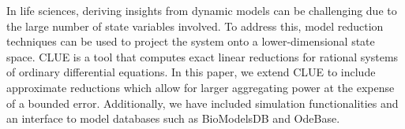 
In life sciences, deriving insights from dynamic models can be challenging due to the large number of state variables involved. 
To address this, model reduction techniques can be used to project the system onto a lower-dimensional state space.
CLUE is a tool that computes exact linear reductions for rational systems of ordinary differential equations.
In this paper, we extend CLUE to include approximate reductions which allow for larger aggregating power at the expense of a bounded error.
Additionally, we have included simulation functionalities and an interface to model databases such as BioModelsDB\cite{BioModels2010} and OdeBase\cite{LuedersSturmRadulescu22}. 


